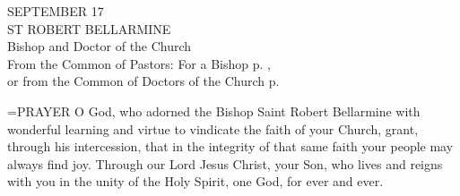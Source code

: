 \begin{center}\normalsize SEPTEMBER 17\\
\footnotesize ST ROBERT BELLARMINE\\
\footnotesize Bishop and Doctor of the Church\\
\footnotesize From the Common of Pastors: For a Bishop p.   , \\
\footnotesize or from the Common of Doctors of the Church p.\\
\end{center}

\hangindent=\parindent \small{PRAYER 
O God, who adorned the Bishop Saint Robert Bellarmine
with wonderful learning and virtue
to vindicate the faith of your Church,
grant, through his intercession,
that in the integrity of that same faith
your people may always find joy.
Through our Lord Jesus Christ, your Son,
who lives and reigns with you in the unity of the Holy Spirit,
one God, for ever and ever.\\}
 

